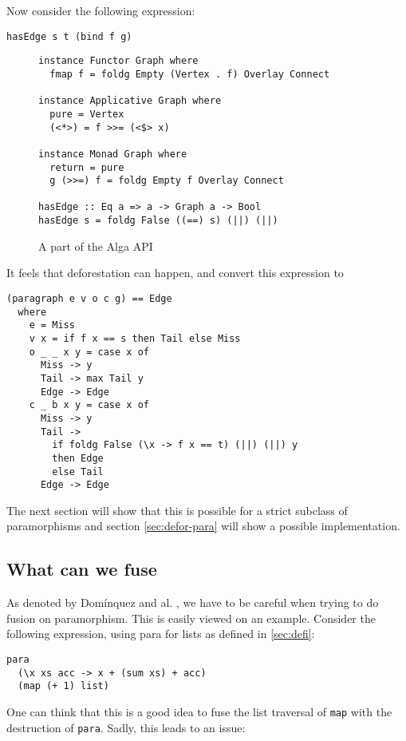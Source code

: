\documentclass[format=sigplan]{acmart}
\newcommand{\minline}[1]{\texttt{#1}}
\begin{document}
Now consider the following expression:
\begin{verbatim}
hasEdge s t (bind f g)
\end{verbatim}

\begin{figure*}
\begin{verbatim}
instance Functor Graph where
  fmap f = foldg Empty (Vertex . f) Overlay Connect

instance Applicative Graph where
  pure = Vertex
  (<*>) = f >>= (<$> x)

instance Monad Graph where
  return = pure
  g (>>=) f = foldg Empty f Overlay Connect
  
hasEdge :: Eq a => a -> Graph a -> Bool
hasEdge s = foldg False ((==) s) (||) (||)
\end{verbatim}
\caption{A part of the Alga API}
\end{figure*}


It feels that deforestation can happen, and convert this expression to
\begin{verbatim}
(paragraph e v o c g) == Edge
  where
    e = Miss
    v x = if f x == s then Tail else Miss
    o _ _ x y = case x of
      Miss -> y
      Tail -> max Tail y
      Edge -> Edge
    c _ b x y = case x of
      Miss -> y
      Tail ->
        if foldg False (\x -> f x == t) (||) (||) y
        then Edge
        else Tail
      Edge -> Edge
\end{verbatim}

The next section will show that this is possible for a strict subclass of paramorphisms and section \ref{sec:defor-para} will show a possible implementation.

\subsection{What can we fuse}

As denoted by Domínquez and al. \cite{paramorphismFusion}, we have to be careful when trying to do fusion on paramorphism.
This is easily viewed on an example. Consider the following expression, using para for lists as defined in \ref{sec:defi}:
\begin{verbatim}
para
  (\x xs acc -> x + (sum xs) + acc)
  (map (+ 1) list)
\end{verbatim}

One can think that this is a good idea to fuse the list traversal of \minline{map} with the destruction of \minline{para}. Sadly, this leads to an issue:
\end{document}
